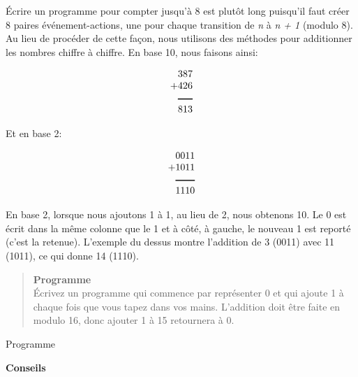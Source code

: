 Écrire un programme pour compter jusqu'à 8 est plutôt long puisqu'il faut créer 8 paires événement-actions, une pour chaque transition de \emph{n} à \emph{n + 1} (modulo 8). Au lieu de procéder de cette façon, nous utilisons des méthodes pour additionner les nombres chiffre à chiffre. En base 10, nous faisons ainsi:

\begin{displaymath}
\begin{array}{r}
387\\
+426\\
\rule[1pt]{1.5em}{1pt}\\
813\\
\end{array}
\end{displaymath}

Et en base 2:

\begin{displaymath}
\begin{array}{r}
0011\\
+1011\\
\rule[1pt]{2em}{1pt}\\
1110\\
\end{array}
\end{displaymath}

En base 2, lorsque nous ajoutons 1 à 1, au lieu de 2, nous obtenons 10. Le 0 est écrit dans la même colonne que le 1 et à côté, à gauche, le nouveau 1 est reporté (c'est la retenue). L'exemple du dessus montre l'addition de 3 (0011) avec 11 (1011), ce qui donne 14 (1110).

\begin{quote}
\textbf{Programme}\\
Écrivez un programme qui commence par représenter 0 et qui ajoute 1 à chaque fois que vous tapez dans vos mains. L'addition doit être faite en modulo 16, donc ajouter 1 à 15 retournera à 0.
\end{quote}

{\raggedleft \hfill Programme }

\textbf{Conseils}

